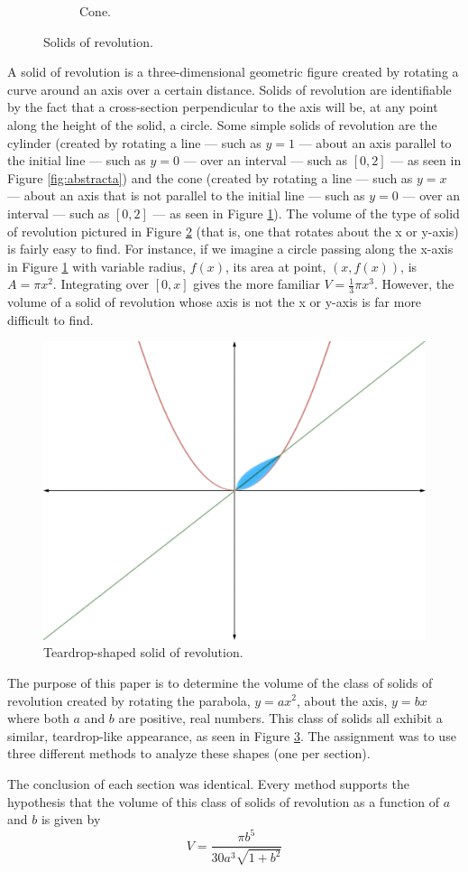 \documentclass{article}
\begin{document}
\begin{figure}[h!]
\begin{subfigure}[b]{0.4\linewidth}
    \caption{Cone.}
    \label{fig:abstractb}
  \end{subfigure}
  \caption{Solids of revolution.}
  \label{fig:abstract}
\end{figure}
A solid of revolution is a three-dimensional geometric figure created by rotating a curve around an axis over a certain distance. Solids of revolution are identifiable by the fact that a cross-section perpendicular to the axis will be, at any point along the height of the solid, a circle. Some simple solids of revolution are the cylinder (created by rotating a line --- such as $y=1$ --- about an axis parallel to the initial line --- such as $y=0$ --- over an interval --- such as $[0,2]$ --- as seen in Figure \ref{fig:abstracta}) and the cone (created by rotating a line --- such as $y=x$ --- about an axis that is not parallel to the initial line --- such as $y=0$ --- over an interval --- such as $[0,2]$ --- as seen in Figure \ref{fig:abstractb}). The volume of the type of solid of revolution pictured in Figure \ref{fig:abstract} (that is, one that rotates about the x or y-axis) is fairly easy to find. For instance, if we imagine a circle passing along the x-axis in Figure \ref{fig:abstractb} with variable radius, $f(x)$, its area at point, $(x,f(x))$, is $A=\pi x^2$. Integrating over $[0,x]$ gives the more familiar $V=\frac{1}{3}\pi x^3$. However, the volume of a solid of revolution whose axis is not the x or y-axis is far more difficult to find.
\begin{figure}[h!]
  \centering
  \includegraphics[width=0.6\linewidth]{Blender/ParabolaLineIntegration-AbstractTeardrop-f_0090.png}
  \caption{Teardrop-shaped solid of revolution.}
  \label{fig:abstract2}
\end{figure}\par
The purpose of this paper is to determine the volume of the class of solids of revolution created by rotating the parabola, $y=ax^2$, about the axis, $y=bx$ where both $a$ and $b$ are positive, real numbers. This class of solids all exhibit a similar, teardrop-like appearance, as seen in Figure \ref{fig:abstract2}. The assignment was to use three different methods to analyze these shapes (one per section).\par
The conclusion of each section was identical. Every method supports the hypothesis that the volume of this class of solids of revolution as a function of $a$ and $b$ is given by$$V=\frac{\pi b^5}{30a^3\sqrt{1+b^2}}$$
\newpage
\end{document}
